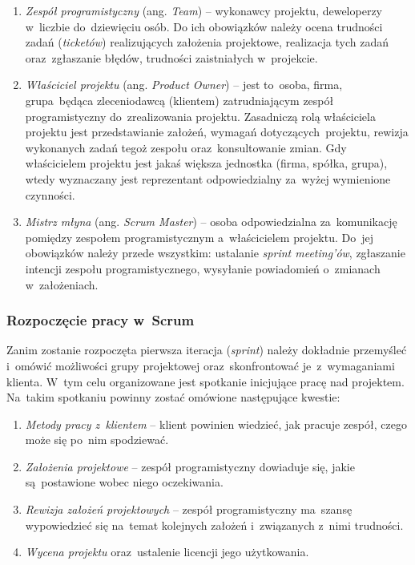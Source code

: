\begin{enumerate}
  \item \textit{Zespół programistyczny} (ang. \textit{Team}) -- wykonawcy projektu, deweloperzy w~liczbie do~dziewięciu osób. Do ich obowiązków należy ocena trudności zadań (\textit{ticketów}) realizujących założenia projektowe, realizacja tych zadań oraz~zgłaszanie błędów, trudności zaistniałych w~projekcie.
  \item \textit{Właściciel projektu} (ang. \textit{Product Owner}) -- jest to~osoba, firma, grupa~będąca zleceniodawcą (klientem) zatrudniającym zespół programistyczny do~zrealizowania projektu. Zasadniczą rolą właściciela projektu jest przedstawianie założeń, wymagań dotyczących~projektu, rewizja wykonanych zadań tegoż zespołu oraz~konsultowanie zmian. Gdy właścicielem projektu jest jakaś większa jednostka (firma, spółka, grupa), wtedy wyznaczany jest reprezentant odpowiedzialny za~wyżej wymienione czynności.
  \item \textit{Mistrz młyna} (ang. \textit{Scrum Master}) -- osoba odpowiedzialna za~komunikację pomiędzy zespołem programistycznym a~właścicielem projektu. Do~jej obowiązków należy przede wszystkim: ustalanie \textit{sprint meeting'ów}, zgłaszanie intencji zespołu programistycznego, wysyłanie powiadomień o~zmianach w~założeniach.
\end{enumerate}

\subsubsection{Rozpoczęcie pracy w~Scrum} \label{scrum.poczatki}

Zanim zostanie rozpoczęta pierwsza iteracja (\textit{sprint}) należy dokładnie przemyśleć i~omówić możliwości grupy projektowej oraz~skonfrontować je~z~wymaganiami klienta. W~tym celu organizowane jest spotkanie inicjujące pracę nad projektem. Na~takim spotkaniu powinny zostać omówione następujące kwestie:

\begin{enumerate}
  \item \textit{Metody pracy z~klientem} -- klient powinien wiedzieć, jak pracuje zespół, czego może się po~nim spodziewać.
  \item \textit{Założenia projektowe} -- zespół programistyczny dowiaduje się, jakie są~postawione wobec niego oczekiwania.
  \item \textit{Rewizja założeń projektowych} -- zespół programistyczny ma~szansę wypowiedzieć się na~temat kolejnych założeń i~związanych z~nimi trudności.
  \item \textit{Wycena projektu} oraz~ustalenie licencji jego użytkowania.
\end{enumerate}

